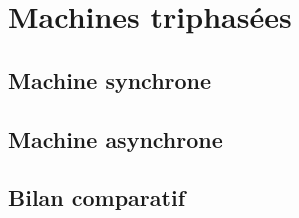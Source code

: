\setchapterpreamble[u]{\margintoc}

\chapter{Machines triphasées}








\section{Machine synchrone}

\section{Machine asynchrone}

\section{Bilan comparatif}
